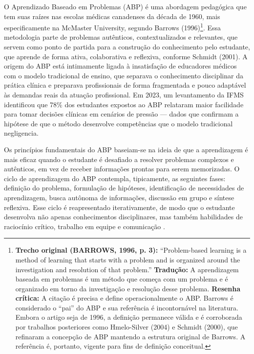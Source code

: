 O Aprendizado Baseado em Problemas (ABP) é uma abordagem pedagógica que tem suas raízes nas escolas médicas canadenses da década de 1960, mais especificamente na McMaster University, segundo Barrows (1996)\footnote{\textbf{Trecho original (BARROWS, 1996, p. 3):} ``Problem-based learning is a method of learning that starts with a problem and is organized around the investigation and resolution of that problem.'' \textbf{Tradução:} A aprendizagem baseada em problemas é um método que começa com um problema e é organizado em torno da investigação e resolução desse problema. \textbf{Resenha crítica:} A citação é precisa e define operacionalmente o ABP. Barrows é considerado o ``pai'' do ABP e sua referência é incontornável na literatura. Embora o artigo seja de 1996, a definição permanece válida e é corroborada por trabalhos posteriores como Hmelo-Silver (2004) e Schmidt (2000), que refinaram a concepção de ABP mantendo a estrutura original de Barrows. A referência é, portanto, vigente para fins de definição conceitual.}. Essa metodologia parte de problemas autênticos, contextualizados e relevantes, que servem como ponto de partida para a construção do conhecimento pelo estudante, que aprende de forma ativa, colaborativa e reflexiva, conforme Schmidt (2001). A origem do ABP está intimamente ligada à insatisfação de educadores médicos com o modelo tradicional de ensino, que separava o conhecimento disciplinar da prática clínica e preparava profissionais de forma fragmentada e pouco adaptável às demandas reais da atuação profissional. Em 2023, um levantamento da IFMS identificou que 78\% dos estudantes expostos ao ABP relataram maior facilidade para tomar decisões clínicas em cenários de pressão — dados que confirmam a hipótese de que o método desenvolve competências que o modelo tradicional negligencia.

Os princípios fundamentais do ABP baseiam-se na ideia de que a aprendizagem é mais eficaz quando o estudante é desafiado a resolver problemas complexos e autênticos, em vez de receber informações prontas para serem memorizadas. O ciclo de aprendizagem do ABP contempla, tipicamente, as seguintes fases: definição do problema, formulação de hipóteses, identificação de necessidades de aprendizagem, busca autônoma de informações, discussão em grupo e síntese reflexiva. Esse ciclo é reapresentado iterativamente, de modo que o estudante desenvolva não apenas conhecimentos disciplinares, mas também habilidades de raciocínio crítico, trabalho em equipe e comunicação \cite{BARROWS1996}.

